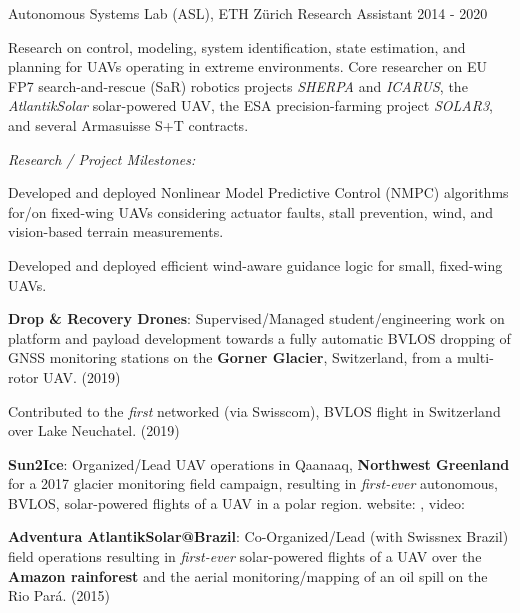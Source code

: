 \begin{cventries}
\cvexpentry
  	{Autonomous Systems Lab (ASL), ETH Z\"{u}rich} %
  	{Research Assistant} %
    {} %
    {2014 - 2020} %
    {
      \begin{cvitems} %
      	\item Research on control, modeling, system identification, state estimation, and planning for UAVs operating in extreme environments. Core researcher on EU FP7 search-and-rescue (SaR) robotics projects \emph{SHERPA} and \emph{ICARUS}, the \emph{AtlantikSolar} solar-powered UAV, the ESA precision-farming project \emph{SOLAR3}, and several Armasuisse S+T contracts. %
		\item[] \hspace{-1.2em} \emph{Research / Project Milestones:}
		\item Developed and deployed Nonlinear Model Predictive Control (NMPC) algorithms for/on fixed-wing UAVs considering actuator faults, stall prevention, wind, and vision-based terrain measurements.
		\item Developed and deployed efficient wind-aware guidance logic for small, fixed-wing UAVs. 
		\item \textbf{Drop \& Recovery Drones}: Supervised/Managed student/engineering work on platform and payload development towards a fully automatic BVLOS dropping of GNSS monitoring stations on the \textbf{Gorner Glacier}, Switzerland, from a multi-rotor UAV. (2019) 
		\item Contributed to the \emph{first} networked (via Swisscom), BVLOS flight in Switzerland over Lake Neuchatel. (2019) 
		\item \textbf{Sun2Ice}: Organized/Lead UAV operations in Qaanaaq, \textbf{Northwest Greenland} for a 2017 glacier monitoring field campaign, resulting in \emph{first-ever} autonomous, BVLOS, solar-powered flights of a UAV in a polar region. website: , video: 
		\item \textbf{Adventura AtlantikSolar@Brazil}: Co-Organized/Lead (with Swissnex Brazil) field operations resulting in \emph{first-ever} solar-powered flights of a UAV over the \textbf{Amazon rainforest} and the aerial monitoring/mapping of an oil spill on the Rio Par\'{a}. (2015) 

\end{cvitems}}
\end{cventries}

